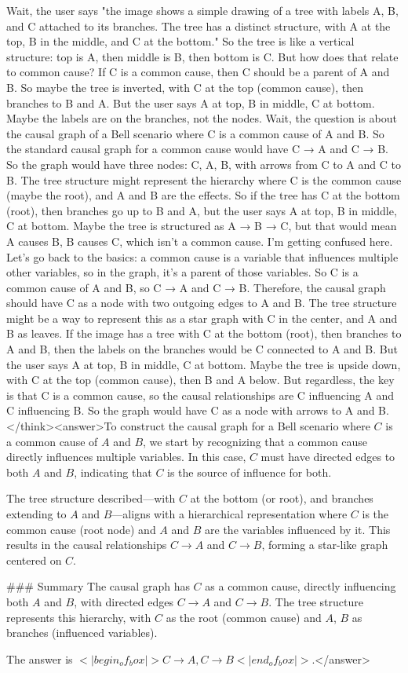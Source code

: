 Wait, the user says "the image shows a simple drawing of a tree with labels A, B, and C attached to its branches. The tree has a distinct structure, with A at the top, B in the middle, and C at the bottom." So the tree is like a vertical structure: top is A, then middle is B, then bottom is C. But how does that relate to common cause? If C is a common cause, then C should be a parent of A and B. So maybe the tree is inverted, with C at the top (common cause), then branches to B and A. But the user says A at top, B in middle, C at bottom. Maybe the labels are on the branches, not the nodes. Wait, the question is about the causal graph of a Bell scenario where C is a common cause of A and B. So the standard causal graph for a common cause would have C → A and C → B. So the graph would have three nodes: C, A, B, with arrows from C to A and C to B. The tree structure might represent the hierarchy where C is the common cause (maybe the root), and A and B are the effects. So if the tree has C at the bottom (root), then branches go up to B and A, but the user says A at top, B in middle, C at bottom. Maybe the tree is structured as A → B → C, but that would mean A causes B, B causes C, which isn't a common cause. I'm getting confused here. Let's go back to the basics: a common cause is a variable that influences multiple other variables, so in the graph, it's a parent of those variables. So C is a common cause of A and B, so C → A and C → B. Therefore, the causal graph should have C as a node with two outgoing edges to A and B. The tree structure might be a way to represent this as a star graph with C in the center, and A and B as leaves. If the image has a tree with C at the bottom (root), then branches to A and B, then the labels on the branches would be C connected to A and B. But the user says A at top, B in middle, C at bottom. Maybe the tree is upside down, with C at the top (common cause), then B and A below. But regardless, the key is that C is a common cause, so the causal relationships are C influencing A and C influencing B. So the graph would have C as a node with arrows to A and B.</think><answer>To construct the causal graph for a Bell scenario where \( C \) is a common cause of \( A \) and \( B \), we start by recognizing that a common cause directly influences multiple variables. In this case, \( C \) must have directed edges to both \( A \) and \( B \), indicating that \( C \) is the source of influence for both.  

The tree structure described—with \( C \) at the bottom (or root), and branches extending to \( A \) and \( B \)—aligns with a hierarchical representation where \( C \) is the common cause (root node) and \( A \) and \( B \) are the variables influenced by it. This results in the causal relationships \( C \to A \) and \( C \to B \), forming a star-like graph centered on \( C \).  

### Summary  
The causal graph has \( C \) as a common cause, directly influencing both \( A \) and \( B \), with directed edges \( C \to A \) and \( C \to B \). The tree structure represents this hierarchy, with \( C \) as the root (common cause) and \( A \), \( B \) as branches (influenced variables).  

The answer is \(<|begin_of_box|>C \to A, C \to B<|end_of_box|>\).</answer>